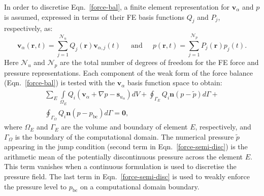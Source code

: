 \documentclass[preprint,authoryear,12pt]{elsarticle}
\begin{document}
In order to discretise Eqn.~\ref{force-bal}, a finite element
representation for $\mathbf{v}_\alpha$ and $p$ is assumed, expressed
in terms of their FE basis functions $Q_{j}$ and $P_{j}$,
respectively, as:
\begin{equation}
  \mathbf{v}_\alpha(\bm{r},t) = \sum\limits_{j=1}^{\mathcal{N}_u}
  Q_{j}(\bm{r})\mathbf{v}_{\alpha,j}(t) \;\;\;\;\text{ and } \;\;\;\;
  p(\bm{r},t) = \sum\limits_{j=1}^{\mathcal{N}_p}
  P_{j}(\bm{r})p_{j}(t).
\end{equation} 
Here $\mathcal{N}_{u}$ and $\mathcal{N}_{p}$ are the total number of
degrees of freedom for the FE force and pressure representations. Each
component of the weak form of the force balance (Eqn.~\ref{force-bal})
is tested with the $\mathbf{v}_\alpha$ basis function space to obtain:
\begin{eqnarray}
  \sum\limits_{E} \left. \int\limits_{\Omega_E} { {Q}}_i \left (
             {\mathbf v}_\alpha + \nabla p -{\mathbf s}_{u_\alpha}
             \right) dV \right. + \displaystyle \oint_{\Gamma_{E}}
                   {Q}_i {\mathbf n} \left(p - \tilde{p}\right)
                   d\Gamma + \nonumber \\ \oint_{\Gamma_{\Omega}} {
                     Q}_i {\mathbf n} \left(p - p_\text{bc}\right) d\Gamma
                   = \bm{0},
                   \label{force-semi-disc} 
\end{eqnarray} 
where $\Omega_E$ and $\Gamma_{E}$ are the volume and boundary of
element $E$, respectively, and $\Gamma_{\Omega}$ is the boundary of
the computational domain. The numerical pressure $\tilde{p}$ appearing
in the jump condition (second term in Eqn.~\ref{force-semi-disc}) is
the arithmetic mean of the potentially discontinuous pressure across
the element $E$. This term vanishes when a continuous formulation is
used to discretise the pressure field. The last term in
Eqn.~\ref{force-semi-disc} is used to weakly enforce the pressure
level to $p_\text{bc}$ on a computational domain boundary.
\end{document}
